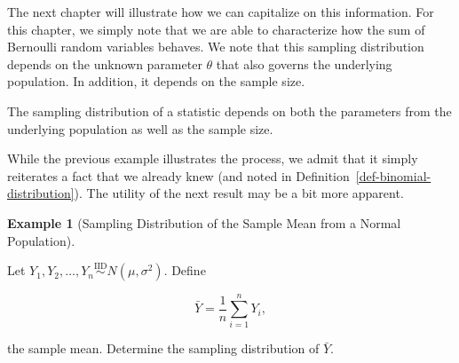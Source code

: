 \documentclass[
  letterpaper,
  DIV=11,
  numbers=noendperiod]{scrreprt}
\theoremstyle{definition}
\theoremstyle{definition}
\newtheorem{example}{Example}[chapter]
\theoremstyle{plain}
\theoremstyle{remark}
\begin{document}
The next chapter will illustrate how we can capitalize on this
information. For this chapter, we simply note that we are able to
characterize how the sum of Bernoulli random variables behaves. We note
that this sampling distribution depends on the unknown parameter
\(\theta\) that also governs the underlying population. In addition, it
depends on the sample size.

\begin{tcolorbox}[enhanced jigsaw, title=\textcolor{quarto-callout-tip-color}{\faLightbulb}\hspace{0.5em}{Big Idea}, colbacktitle=quarto-callout-tip-color!10!white, titlerule=0mm, toptitle=1mm, breakable, bottomtitle=1mm, colframe=quarto-callout-tip-color-frame, opacitybacktitle=0.6, bottomrule=.15mm, arc=.35mm, toprule=.15mm, colback=white, rightrule=.15mm, coltitle=black, leftrule=.75mm, left=2mm, opacityback=0]

The sampling distribution of a statistic depends on both the parameters
from the underlying population as well as the sample size.

\end{tcolorbox}

While the previous example illustrates the process, we admit that it
simply reiterates a fact that we already knew (and noted in
Definition~\ref{def-binomial-distribution}). The utility of the next
result may be a bit more apparent.

\begin{example}[Sampling Distribution of the Sample Mean from a Normal
Population]\protect\hypertarget{exm-normal-mean}{}\label{exm-normal-mean}

Let
\(Y_1, Y_2, \dotsc, Y_n \stackrel{\text{IID}}{\sim} N\left(\mu,\sigma^2\right)\).
Define

\[\bar{Y} = \frac{1}{n}\sum_{i=1}^{n} Y_i,\]

the sample mean. Determine the sampling distribution of \(\bar{Y}\).

\end{example}
\end{document}
